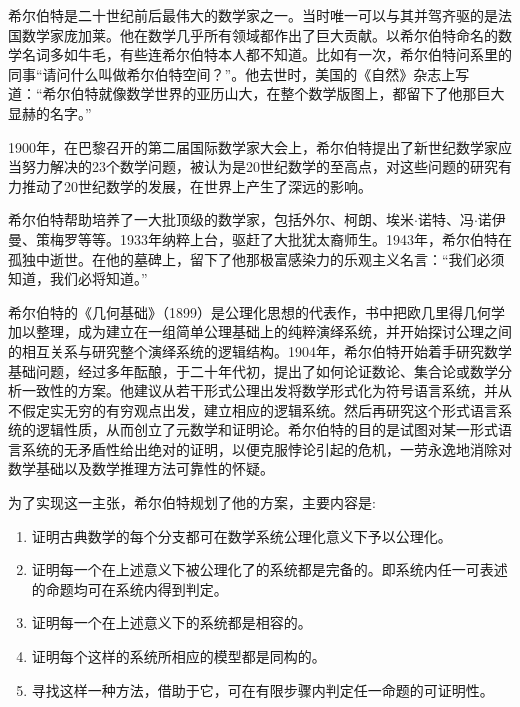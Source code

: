 \documentclass{article}
\begin{document}
希尔伯特是二十世纪前后最伟大的数学家之一。当时唯一可以与其并驾齐驱的是法国数学家庞加莱。他在数学几乎所有领域都作出了巨大贡献。以希尔伯特命名的数学名词多如牛毛，有些连希尔伯特本人都不知道。比如有一次，希尔伯特问系里的同事“请问什么叫做希尔伯特空间？”。他去世时，美国的《自然》杂志上写道：“希尔伯特就像数学世界的亚历山大，在整个数学版图上，都留下了他那巨大显赫的名字。”\cite{HanXueTao16}

1900年，在巴黎召开的第二届国际数学家大会上，希尔伯特提出了新世纪数学家应当努力解决的23个数学问题，被认为是20世纪数学的至高点，对这些问题的研究有力推动了20世纪数学的发展，在世界上产生了深远的影响。

希尔伯特帮助培养了一大批顶级的数学家，包括外尔、柯朗、埃米$\cdot$诺特、冯$\cdot$诺伊曼、策梅罗等等。1933年纳粹上台，驱赶了大批犹太裔师生。1943年，希尔伯特在孤独中逝世。在他的墓碑上，留下了他那极富感染力的乐观主义名言：“我们必须知道，我们必将知道。”

希尔伯特的《几何基础》（1899）是公理化思想的代表作，书中把欧几里得几何学加以整理，成为建立在一组简单公理基础上的纯粹演绎系统，并开始探讨公理之间的相互关系与研究整个演绎系统的逻辑结构。1904年，希尔伯特开始着手研究数学基础问题，经过多年酝酿，于二十年代初，提出了如何论证数论、集合论或数学分析一致性的方案。他建议从若干形式公理出发将数学形式化为符号语言系统，并从不假定实无穷的有穷观点出发，建立相应的逻辑系统。然后再研究这个形式语言系统的逻辑性质，从而创立了元数学和证明论。希尔伯特的目的是试图对某一形式语言系统的无矛盾性给出绝对的证明，以便克服悖论引起的危机，一劳永逸地消除对数学基础以及数学推理方法可靠性的怀疑。

为了实现这一主张，希尔伯特规划了他的方案，主要内容是:
\begin{enumerate}
\item 证明古典数学的每个分支都可在数学系统公理化意义下予以公理化。
\item 证明每一个在上述意义下被公理化了的系统都是完备的。即系统内任一可表述的命题均可在系统内得到判定。
\item 证明每一个在上述意义下的系统都是相容的。
\item 证明每个这样的系统所相应的模型都是同构的。
\item 寻找这样一种方法，借助于它，可在有限步骤内判定任一命题的可证明性。
\end{enumerate}
\end{document}
